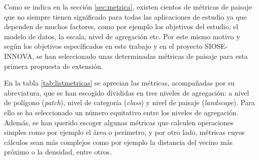 Como se indica en la sección \ref{sec:metrica}, existen cientos de métricas de paisaje que no siempre tienen significado para todas las aplicaciones de estudio ya que dependen de muchos factores, como por ejemplo los objetivos del estudio, el modelo de datos, la escala, nivel de agregación etc. Por este mismo motivo y según los objetivos específicados en este trabajo y en el proyecto SIOSE-INNOVA, se han seleccionado unas determinadas métricas de paisaje para esta primera propuesta de extensión.

En la tabla \ref{tab:listmetricas} se aprecian las métricas, acompañadas por su abreviatura, que se han escogido divididas en tres niveles de agregación: a nivel de polígono (\textit{patch}), nivel de categoría (\textit{class}) y nivel de paisaje (\textit{landscape}). Para ello se ha seleccionado un número equitativo entre los niveles de agregación. Además, se han querido escoger algunas métricas que calculen operaciones simples como por ejemplo el área o perímetro, y por otro lado, métricas cuyos cálculos sean más complejos como por ejemplo la distancia del vecino más próximo o la densidad, entre otros.

